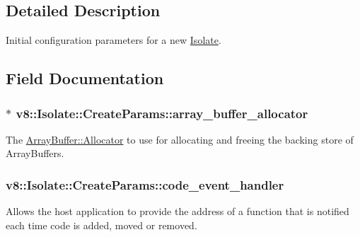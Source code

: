\subsection{Detailed Description}
Initial configuration parameters for a new \hyperlink{classv8_1_1Isolate}{Isolate}. 

\subsection{Field Documentation}
\subsubsection[{\texorpdfstring{array\+\_\+buffer\+\_\+allocator}{array_buffer_allocator}}]{$\ast$ v8\+::\+Isolate\+::\+Create\+Params\+::array\+\_\+buffer\+\_\+allocator}\hypertarget{structv8_1_1Isolate_1_1CreateParams_a7c663f70b64290392eeaf164f57585f9}{}\label{structv8_1_1Isolate_1_1CreateParams_a7c663f70b64290392eeaf164f57585f9}
The \hyperlink{classv8_1_1ArrayBuffer_1_1Allocator}{Array\+Buffer\+::\+Allocator} to use for allocating and freeing the backing store of Array\+Buffers. 
\subsubsection[{\texorpdfstring{code\+\_\+event\+\_\+handler}{code_event_handler}}]{ v8\+::\+Isolate\+::\+Create\+Params\+::code\+\_\+event\+\_\+handler}\hypertarget{structv8_1_1Isolate_1_1CreateParams_a783e3eba90ce6e2800bdd69197bbccdd}{}\label{structv8_1_1Isolate_1_1CreateParams_a783e3eba90ce6e2800bdd69197bbccdd}
Allows the host application to provide the address of a function that is notified each time code is added, moved or removed. 
